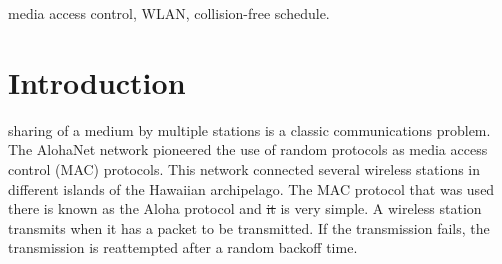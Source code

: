 \documentclass[journal]{IEEEtran}
\providecommand{\DIFadd}[1]{{\protect\color{blue}\uwave{#1}}} %
\providecommand{\DIFdel}[1]{{\protect\color{red}\sout{#1}}}                      %
\providecommand{\DIFaddbegin}{} %
\providecommand{\DIFaddend}{} %
\providecommand{\DIFdelbegin}{} %
\providecommand{\DIFdelend}{} %
\begin{document}
\begin{IEEEkeywords}
 media access control, WLAN, collision-free schedule.
\end{IEEEkeywords}






%
\IEEEpeerreviewmaketitle



\section{Introduction}
% 
% 
% 
% 
 \DIFaddbegin \DIFadd{distributed }\DIFaddend sharing of a medium by multiple stations is a classic communications problem. 
The AlohaNet network \cite{abramson2009asw} pioneered the use of random protocols as media access control (MAC) protocols.
This network connected several wireless stations in different islands of the Hawaiian archipelago.
The MAC protocol that was used there is known as the Aloha protocol and \DIFdelbegin \DIFdel{it }\DIFdelend is very simple.
A wireless station transmits when it has a packet to be transmitted. 
If the transmission fails, the transmission is reattempted after a random backoff time.
\end{document}
